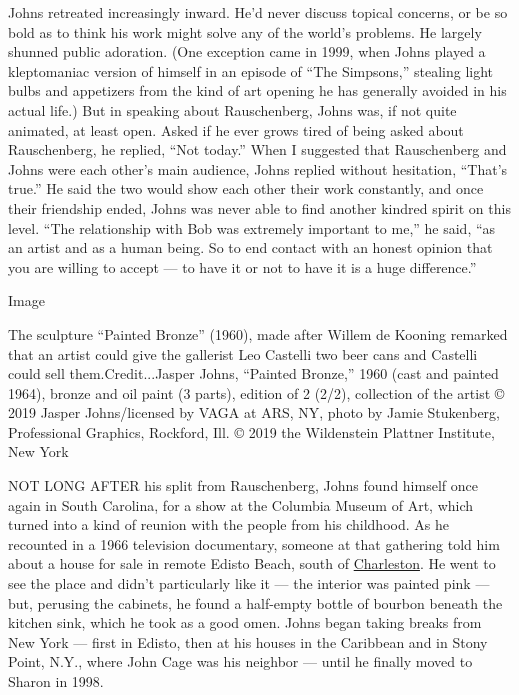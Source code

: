 Johns retreated increasingly inward. He'd never discuss topical
concerns, or be so bold as to think his work might solve any of the
world's problems. He largely shunned public adoration. (One exception
came in 1999, when Johns played a kleptomaniac version of himself in an
episode of ``The Simpsons,'' stealing light bulbs and appetizers from
the kind of art opening he has generally avoided in his actual life.)
But in speaking about Rauschenberg, Johns was, if not quite animated, at
least open. Asked if he ever grows tired of being asked about
Rauschenberg, he replied, ``Not today.'' When I suggested that
Rauschenberg and Johns were each other's main audience, Johns replied
without hesitation, ``That's true.'' He said the two would show each
other their work constantly, and once their friendship ended, Johns was
never able to find another kindred spirit on this level. ``The
relationship with Bob was extremely important to me,'' he said, ``as an
artist and as a human being. So to end contact with an honest opinion
that you are willing to accept --- to have it or not to have it is a
huge difference.''

Image

The sculpture ``Painted Bronze'' (1960), made after Willem de Kooning
remarked that an artist could give the gallerist Leo Castelli two beer
cans and Castelli could sell them.Credit...Jasper Johns, ``Painted
Bronze,'' 1960 (cast and painted 1964), bronze and oil paint (3 parts),
edition of 2 (2/2), collection of the artist © 2019 Jasper
Johns/licensed by VAGA at ARS, NY, photo by Jamie Stukenberg,
Professional Graphics, Rockford, Ill. © 2019 the Wildenstein Plattner
Institute, New York

NOT LONG AFTER his split from Rauschenberg, Johns found himself once
again in South Carolina, for a show at the Columbia Museum of Art, which
turned into a kind of reunion with the people from his childhood. As he
recounted in a 1966 television documentary, someone at that gathering
told him about a house for sale in remote Edisto Beach, south of
\href{https://www.nytimes.com/interactive/2017/01/12/travel/what-to-do-36-hours-in-charleston-south-carolina.html}{Charleston}.
He went to see the place and didn't particularly like it --- the
interior was painted pink --- but, perusing the cabinets, he found a
half-empty bottle of bourbon beneath the kitchen sink, which he took as
a good omen. Johns began taking breaks from New York --- first in
Edisto, then at his houses in the Caribbean and in Stony Point, N.Y.,
where John Cage was his neighbor --- until he finally moved to Sharon in
1998.

